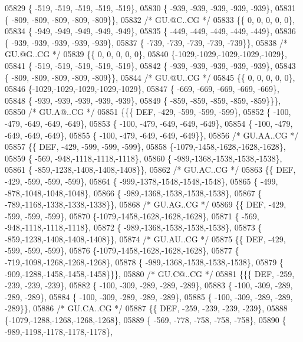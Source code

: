\begin{DoxyCode}
05829 \{ -519, -519, -519, -519, -519\},
05830 \{ -939, -939, -939, -939, -939\},
05831 \{ -809, -809, -809, -809, -809\}\},
05832 \textcolor{comment}{/* GU.@C..CG */}
05833 \{\{    0,    0,    0,    0,    0\},
05834 \{ -949, -949, -949, -949, -949\},
05835 \{ -449, -449, -449, -449, -449\},
05836 \{ -939, -939, -939, -939, -939\},
05837 \{ -739, -739, -739, -739, -739\}\},
05838 \textcolor{comment}{/* GU.@G..CG */}
05839 \{\{    0,    0,    0,    0,    0\},
05840 \{-1029,-1029,-1029,-1029,-1029\},
05841 \{ -519, -519, -519, -519, -519\},
05842 \{ -939, -939, -939, -939, -939\},
05843 \{ -809, -809, -809, -809, -809\}\},
05844 \textcolor{comment}{/* GU.@U..CG */}
05845 \{\{    0,    0,    0,    0,    0\},
05846 \{-1029,-1029,-1029,-1029,-1029\},
05847 \{ -669, -669, -669, -669, -669\},
05848 \{ -939, -939, -939, -939, -939\},
05849 \{ -859, -859, -859, -859, -859\}\}\},
05850 \textcolor{comment}{/* GU.A@..CG */}
05851 \{\{\{  DEF, -429, -599, -599, -599\},
05852 \{ -100, -479, -649, -649, -649\},
05853 \{ -100, -479, -649, -649, -649\},
05854 \{ -100, -479, -649, -649, -649\},
05855 \{ -100, -479, -649, -649, -649\}\},
05856 \textcolor{comment}{/* GU.AA..CG */}
05857 \{\{  DEF, -429, -599, -599, -599\},
05858 \{-1079,-1458,-1628,-1628,-1628\},
05859 \{ -569, -948,-1118,-1118,-1118\},
05860 \{ -989,-1368,-1538,-1538,-1538\},
05861 \{ -859,-1238,-1408,-1408,-1408\}\},
05862 \textcolor{comment}{/* GU.AC..CG */}
05863 \{\{  DEF, -429, -599, -599, -599\},
05864 \{ -999,-1378,-1548,-1548,-1548\},
05865 \{ -499, -878,-1048,-1048,-1048\},
05866 \{ -989,-1368,-1538,-1538,-1538\},
05867 \{ -789,-1168,-1338,-1338,-1338\}\},
05868 \textcolor{comment}{/* GU.AG..CG */}
05869 \{\{  DEF, -429, -599, -599, -599\},
05870 \{-1079,-1458,-1628,-1628,-1628\},
05871 \{ -569, -948,-1118,-1118,-1118\},
05872 \{ -989,-1368,-1538,-1538,-1538\},
05873 \{ -859,-1238,-1408,-1408,-1408\}\},
05874 \textcolor{comment}{/* GU.AU..CG */}
05875 \{\{  DEF, -429, -599, -599, -599\},
05876 \{-1079,-1458,-1628,-1628,-1628\},
05877 \{ -719,-1098,-1268,-1268,-1268\},
05878 \{ -989,-1368,-1538,-1538,-1538\},
05879 \{ -909,-1288,-1458,-1458,-1458\}\}\},
05880 \textcolor{comment}{/* GU.C@..CG */}
05881 \{\{\{  DEF, -259, -239, -239, -239\},
05882 \{ -100, -309, -289, -289, -289\},
05883 \{ -100, -309, -289, -289, -289\},
05884 \{ -100, -309, -289, -289, -289\},
05885 \{ -100, -309, -289, -289, -289\}\},
05886 \textcolor{comment}{/* GU.CA..CG */}
05887 \{\{  DEF, -259, -239, -239, -239\},
05888 \{-1079,-1288,-1268,-1268,-1268\},
05889 \{ -569, -778, -758, -758, -758\},
05890 \{ -989,-1198,-1178,-1178,-1178\},

\end{DoxyCode}
